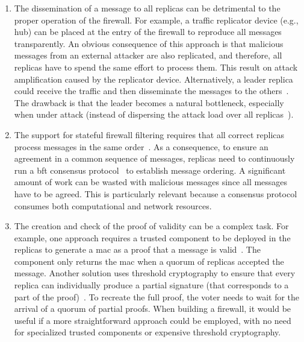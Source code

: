 \begin{enumerate}

\item The dissemination of a message to all replicas can be detrimental to the proper operation of the firewall. 
For example, a traffic replicator device (e.g., hub) can be placed at the entry of the firewall to reproduce all messages~\cite{Sousa:2010,Roeder:2010} transparently. 
An obvious consequence of this approach is that malicious messages from an external attacker are also replicated, and therefore, all replicas have to spend the same effort to process them.
This result on attack amplification caused by the replicator device.
Alternatively, a leader replica could receive the traffic and then disseminate the messages to the others~\cite{Roeder:2010}.
The drawback is that the leader becomes a natural bottleneck, especially when under attack (instead of dispersing the attack load over all replicas~\cite{Amir:2011}).

\item The support for stateful firewall filtering requires that all correct replicas process messages in the same order~\cite{Schneider:1990}.
As a consequence, to ensure an agreement in a common sequence of messages, replicas need to continuously run a \gls{bft} consensus protocol~\cite{Castro:2002} to establish message ordering.
A significant amount of work can be wasted with malicious messages since all messages have to be agreed. This is particularly relevant because a consensus protocol consumes both computational and network resources.

\item The creation and check of the proof of validity can be a complex task. For example, one approach requires a trusted component to be deployed in the replicas to generate a \gls{mac} as a proof that a message is valid~\cite{Sousa:2010}. 
The component only returns the \gls{mac} when a quorum of replicas accepted the message. 
Another solution uses threshold cryptography to ensure that every replica can individually produce a partial signature (that corresponds to a part of the proof)~\cite{Roeder:2010}. 
To recreate the full proof, the voter needs to wait for the arrival of a quorum of partial proofs. 
When building a firewall, it would be useful if a more straightforward approach could be employed, with no need for specialized trusted components or expensive threshold cryptography.

\end{enumerate}

